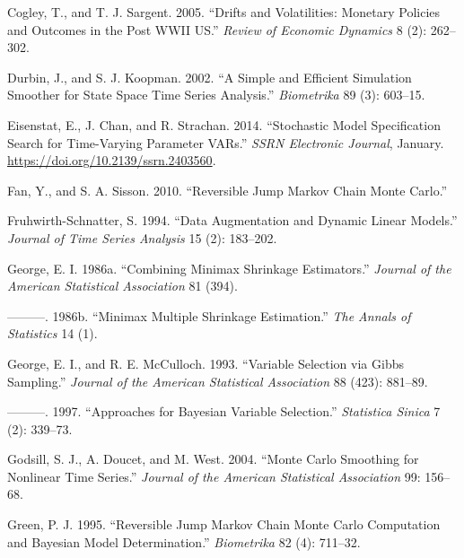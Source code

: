 \documentclass[
  12pt,
]{book}
\newlength{\cslhangindent}
\newlength{\cslentryspacingunit} %
\newenvironment{CSLReferences}[2] %
 {%
  \setlength{\parindent}{0pt}
  \ifodd #1
  \let\oldpar\par
  \def\par{\hangindent=\cslhangindent\oldpar}
  \fi
  \setlength{\parskip}{#2\cslentryspacingunit}
 }%
 {}
\theoremstyle{break}
\theoremstyle{nonumberplain}
\begin{document}
\begin{CSLReferences}{1}{0}
\leavevmode{}%
Cogley, T., and T. J. Sargent. 2005. {``Drifts and Volatilities:
Monetary Policies and Outcomes in the Post WWII US.''} \emph{Review of
Economic Dynamics} 8 (2): 262--302.

\leavevmode{}%
Durbin, J., and S. J. Koopman. 2002. {``A Simple and Efficient
Simulation Smoother for State Space Time Series Analysis.''}
\emph{Biometrika} 89 (3): 603--15.

\leavevmode{}%
Eisenstat, E., J. Chan, and R. Strachan. 2014. {``Stochastic Model
Specification Search for Time-Varying Parameter VARs.''} \emph{SSRN
Electronic Journal}, January.
\url{https://doi.org/10.2139/ssrn.2403560}.

\leavevmode{}%
Fan, Y., and S. A. Sisson. 2010. {``Reversible Jump Markov Chain Monte
Carlo.''}

\leavevmode{}%
Fruhwirth-Schnatter, S. 1994. {``Data Augmentation and Dynamic Linear
Models.''} \emph{Journal of Time Series Analysis} 15 (2): 183--202.

\leavevmode{}%
George, E. I. 1986a. {``Combining Minimax Shrinkage Estimators.''}
\emph{Journal of the American Statistical Association} 81 (394).

\leavevmode{}%
---------. 1986b. {``Minimax Multiple Shrinkage Estimation.''} \emph{The
Annals of Statistics} 14 (1).

\leavevmode{}%
George, E. I., and R. E. McCulloch. 1993. {``Variable Selection via
Gibbs Sampling.''} \emph{Journal of the American Statistical
Association} 88 (423): 881--89.

\leavevmode{}%
---------. 1997. {``Approaches for Bayesian Variable Selection.''}
\emph{Statistica Sinica} 7 (2): 339--73.

\leavevmode{}%
Godsill, S. J., A. Doucet, and M. West. 2004. {``Monte Carlo Smoothing
for Nonlinear Time Series.''} \emph{Journal of the American Statistical
Association} 99: 156--68.

\leavevmode{}%
Green, P. J. 1995. {``Reversible Jump Markov Chain Monte Carlo
Computation and Bayesian Model Determination.''} \emph{Biometrika} 82
(4): 711--32.


\end{CSLReferences}
\end{document}
